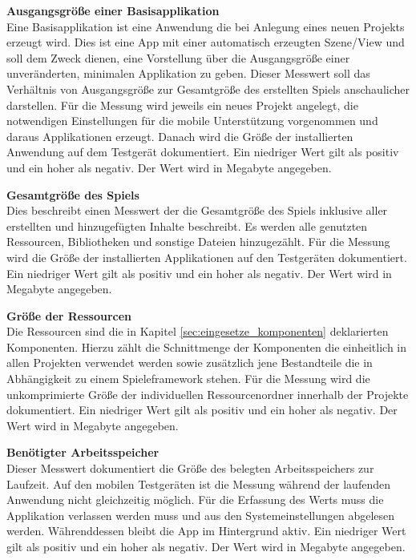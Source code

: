 \bigskip
\textbf{Ausgangsgröße einer Basisapplikation} \\
Eine Basisapplikation ist eine Anwendung die bei Anlegung eines neuen Projekts erzeugt wird. Dies ist eine App mit einer automatisch erzeugten Szene/View und soll dem Zweck dienen, eine Vorstellung über die Ausgangsgröße einer unveränderten, minimalen Applikation zu geben. Dieser Messwert soll das Verhältnis von Ausgangsgröße zur Gesamtgröße des erstellten Spiels anschaulicher darstellen. Für die Messung wird jeweils ein neues Projekt angelegt, die notwendigen Einstellungen für die mobile Unterstützung vorgenommen und daraus Applikationen erzeugt. Danach wird die Größe der installierten Anwendung auf dem Testgerät dokumentiert. Ein niedriger Wert gilt als positiv und ein hoher als negativ. Der Wert wird in Megabyte angegeben.

\bigskip
\textbf{Gesamtgröße des Spiels} \\
Dies beschreibt einen Messwert der die Gesamtgröße des Spiels inklusive aller erstellten und hinzugefügten Inhalte beschreibt. Es werden alle genutzten Ressourcen, Bibliotheken und sonstige Dateien hinzugezählt. Für die Messung wird die Größe der installierten Applikationen auf den Testgeräten dokumentiert. Ein niedriger Wert gilt als positiv und ein hoher als negativ. Der Wert wird in Megabyte angegeben.

\bigskip
\textbf{Größe der Ressourcen} \\
Die Ressourcen sind die in Kapitel \ref{sec:eingesetze_komponenten} deklarierten Komponenten. Hierzu zählt die Schnittmenge der Komponenten die einheitlich in allen Projekten verwendet werden sowie zusätzlich jene Bestandteile die in Abhängigkeit zu einem Spieleframework stehen. Für die Messung wird die unkomprimierte Größe der individuellen Ressourcenordner innerhalb der Projekte dokumentiert. Ein niedriger Wert gilt als positiv und ein hoher als negativ. Der Wert wird in Megabyte angegeben.

\bigskip
\textbf{Benötigter Arbeitsspeicher} \\
Dieser Messwert dokumentiert die Größe des belegten Arbeitsspeichers zur Laufzeit. Auf den mobilen Testgeräten ist die Messung während der laufenden Anwendung nicht gleichzeitig möglich. Für die Erfassung des Werts muss die Applikation verlassen werden muss und aus den Systemeinstellungen abgelesen werden. Währenddessen bleibt die App im Hintergrund aktiv. Ein niedriger Wert gilt als positiv und ein hoher als negativ. Der Wert wird in Megabyte angegeben.

